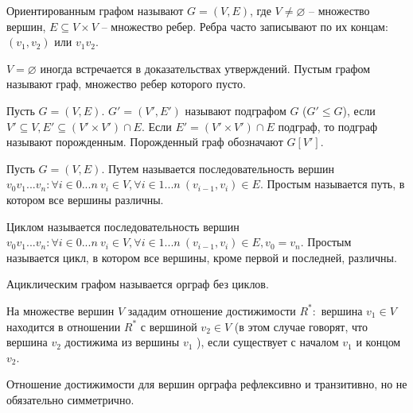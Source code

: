 	\begin{Def}
		Ориентированным графом называют $G = (V, E)$, где $V \neq \varnothing$ -- множество вершин, $E \subseteq V \times V$ -- множество ребер.
		Ребра часто записывают по их концам: $(v_1, v_2)$ или $v_1 v_2$. 
	\end{Def}

	\begin{Rem}
		$V = \varnothing$ иногда встречается в доказательствах утверждений. Пустым графом называют граф, множество ребер которого пусто.
	\end{Rem}

	\begin{Def}
		Пусть $G = (V, E)$. $G' = (V', E')$ называют подграфом $G$ ($G' \leqslant G$), если $V' \subseteq V, E' \subseteq (V' \times V') \cap E$. Если $E' = (V' \times V') \cap E$ подграф, то подграф называют порожденным.
		Порожденный граф обозначают $G[V']$. 
	\end{Def}

	\begin{Def}
		Пусть $G = (V, E)$. Путем называется последовательность вершин $v_0 v_1 ... v_n : \forall i \in 0...n \ v_i \in V, \forall i \in 1...n \ (v_{i - 1}, v_i) \in E$.
		Простым называется путь, в котором все вершины различны. 
	\end{Def}

	\begin{Def}
		Циклом называется последовательность вершин $v_0 v_1 ... v_n : \forall i \in 0...n \ v_i \in V, \forall i \in 1 ... n \ (v_{i - 1}, v_i) \in E, v_0 = v_n$.
		Простым называется цикл, в котором все вершины, кроме первой и последней, различны. 
	\end{Def}

	\begin{Def}
		Ациклическим графом называется орграф без циклов.
	\end{Def}


	\begin{Def}
		На множестве вершин $V$ зададим отношение достижимости $R^*:$ вершина $v_1 \in V$ находится в отношении $R^*$ с вершиной $v_2 \in V$ 
	(в этом случае говорят, что вершина $v_2$ достижима из вершины $v_1$ ), если существует с началом $v_1$ и концом $v_2$.
	\end{Def} 

	\begin{Rem}
		Отношение достижимости для вершин орграфа рефлексивно и транзитивно, но не обязательно симметрично.
	\end{Rem}

